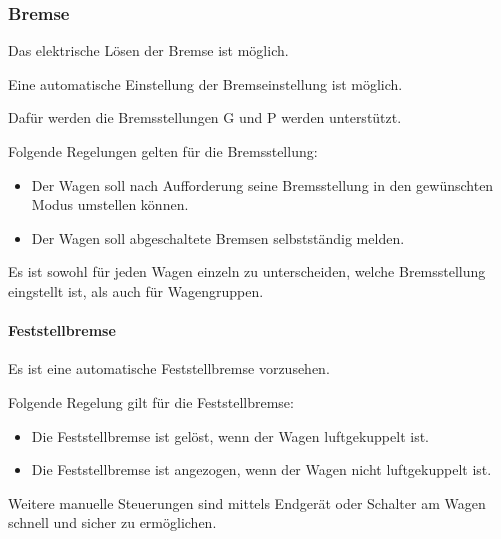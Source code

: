 \subsubsection{Bremse}
\begin{feat}
Das elektrische Lösen der Bremse ist möglich.
\end{feat}
\begin{feat}
Eine automatische Einstellung der Bremseinstellung ist möglich.
\end{feat}
\begin{rem} [zu Anf. 17]
Dafür werden die Bremsstellungen G und P werden unterstützt.
\end{rem}
\begin{rem} [zu Anf. 17]
Folgende Regelungen gelten für die Bremsstellung:
\begin{itemize}
    \item Der Wagen soll nach Aufforderung seine Bremsstellung in den gewünschten Modus umstellen können.
    \item Der Wagen soll abgeschaltete Bremsen selbstständig melden.
\end{itemize}
\end{rem}
\begin{rem} [zu Anf. 17]
Es ist sowohl für jeden Wagen einzeln zu unterscheiden, welche Bremsstellung eingstellt ist, als auch für Wagengruppen.%
\end{rem}

\paragraph{Feststellbremse}
\begin{feat}
Es ist eine automatische Feststellbremse vorzusehen.
\end{feat}
\begin{rem} [zu Anf. 18]
Folgende Regelung gilt für die Feststellbremse:
\begin{itemize}
    \item Die Feststellbremse ist gelöst, wenn der Wagen luftgekuppelt ist.
    \item Die Feststellbremse ist angezogen, wenn der Wagen nicht luftgekuppelt ist.
\end{itemize}
\end{rem}
\begin{rem} [zu Anf. 18]
Weitere manuelle Steuerungen sind mittels Endgerät oder \newline Schalter am Wagen schnell und sicher zu ermöglichen.
\end{rem}

